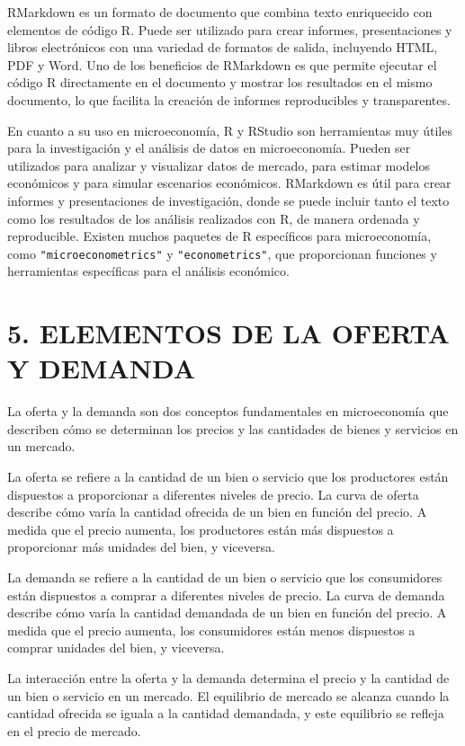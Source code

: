 \documentclass[
  spanish,
  12pt,
]{book}
\begin{document}
RMarkdown es un formato de documento que combina texto enriquecido con
elementos de código R. Puede ser utilizado para crear informes,
presentaciones y libros electrónicos con una variedad de formatos de
salida, incluyendo HTML, PDF y Word. Uno de los beneficios de RMarkdown
es que permite ejecutar el código R directamente en el documento y
mostrar los resultados en el mismo documento, lo que facilita la
creación de informes reproducibles y transparentes.

En cuanto a su uso en microeconomía, R y RStudio son herramientas muy
útiles para la investigación y el análisis de datos en microeconomía.
Pueden ser utilizados para analizar y visualizar datos de mercado, para
estimar modelos económicos y para simular escenarios económicos.
RMarkdown es útil para crear informes y presentaciones de investigación,
donde se puede incluir tanto el texto como los resultados de los
análisis realizados con R, de manera ordenada y reproducible. Existen
muchos paquetes de R específicos para microeconomía, como
\texttt{"microeconometrics"} y \texttt{"econometrics"}, que proporcionan
funciones y herramientas específicas para el análisis económico.

\chapter{5. ELEMENTOS DE LA OFERTA Y
DEMANDA}\label{elementos-de-la-oferta-y-demanda}

La oferta y la demanda son dos conceptos fundamentales en microeconomía
que describen cómo se determinan los precios y las cantidades de bienes
y servicios en un mercado.

La oferta se refiere a la cantidad de un bien o servicio que los
productores están dispuestos a proporcionar a diferentes niveles de
precio. La curva de oferta describe cómo varía la cantidad ofrecida de
un bien en función del precio. A medida que el precio aumenta, los
productores están más dispuestos a proporcionar más unidades del bien, y
viceversa.

La demanda se refiere a la cantidad de un bien o servicio que los
consumidores están dispuestos a comprar a diferentes niveles de precio.
La curva de demanda describe cómo varía la cantidad demandada de un bien
en función del precio. A medida que el precio aumenta, los consumidores
están menos dispuestos a comprar unidades del bien, y viceversa.

La interacción entre la oferta y la demanda determina el precio y la
cantidad de un bien o servicio en un mercado. El equilibrio de mercado
se alcanza cuando la cantidad ofrecida se iguala a la cantidad
demandada, y este equilibrio se refleja en el precio de mercado.
\end{document}
